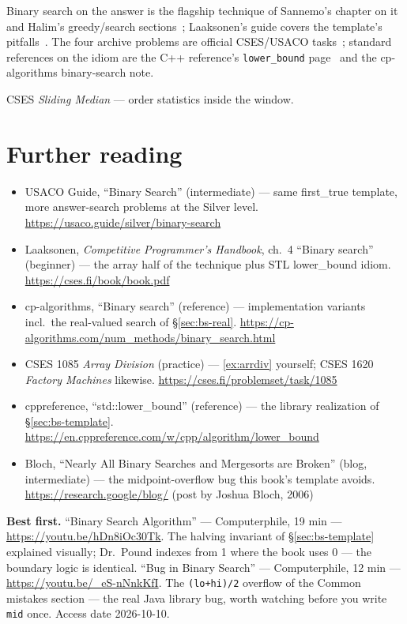 \chapternotes
Binary search on the answer is the flagship technique of
Sannemo's chapter on it~\cite{sannemo2025} and Halim's greedy/search
sections~\cite{halimcp4}; Laaksonen's guide covers the template's
pitfalls~\cite{laaksonen2024}. The four archive problems are official
CSES/USACO tasks~\cite{cses,usacoguide}; standard references on the
idiom are the C++ reference's \texttt{lower\_bound}
page~\cite{cppreference} and the cp-algorithms binary-search note.
\begin{exercise}[hard] CSES \emph{Sliding Median} --- order statistics inside the window. \end{exercise}

\section*{Further reading}
\begin{itemize}
\item USACO Guide, ``Binary Search'' (intermediate) --- same first\_true
template, more answer-search problems at the Silver level. \newline\url{https://usaco.guide/silver/binary-search}
\item Laaksonen, \emph{Competitive Programmer's Handbook}, ch.~4
``Binary search'' (beginner) ---
the array half of the technique plus STL lower\_bound idiom. \newline\url{https://cses.fi/book/book.pdf}
\item cp-algorithms, ``Binary search'' (reference) ---
implementation variants incl.\ the real-valued search of
\S\ref{sec:bs-real}. \newline\url{https://cp-algorithms.com/num_methods/binary_search.html}
\item CSES 1085 \emph{Array Division} (practice) --- \ref{ex:arrdiv} yourself;
CSES 1620 \emph{Factory Machines} likewise. \newline\url{https://cses.fi/problemset/task/1085}
\item cppreference, ``std::lower\_bound'' (reference) --- the
library realization of \S\ref{sec:bs-template}. \newline\url{https://en.cppreference.com/w/cpp/algorithm/lower_bound}
\item Bloch, ``Nearly All Binary Searches and Mergesorts are Broken''
(blog, intermediate) ---
the midpoint-overflow bug this book's template avoids.
\newline\url{https://research.google/blog/} (post by Joshua Bloch, 2006)
\end{itemize}

\begin{rulebox}
\smallskip\noindent\textbf{Best first.}
``Binary Search Algorithm'' --- Computerphile, 19 min ---
\url{https://youtu.be/hDn8iOc30Tk}. The halving
invariant of \S\ref{sec:bs-template} explained visually; Dr.\ Pound
indexes from 1 where the book uses 0 --- the boundary logic is
identical.
\smallskip\noindent
``Bug in Binary Search'' --- Computerphile, 12 min ---
\url{https://youtu.be/_eS-nNnkKfI}. The
\texttt{(lo+hi)/2} overflow of the Common mistakes section --- the real
Java library bug, worth watching before you write \texttt{mid} once.
Access date 2026-10-10.
\end{rulebox}
